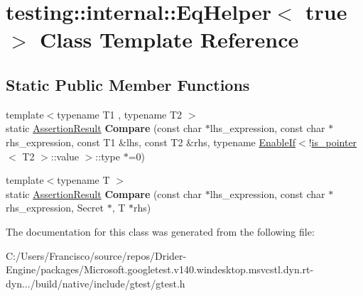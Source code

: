 \hypertarget{classtesting_1_1internal_1_1_eq_helper_3_01true_01_4}{}\section{testing\+:\+:internal\+:\+:Eq\+Helper$<$ true $>$ Class Template Reference}
\label{classtesting_1_1internal_1_1_eq_helper_3_01true_01_4}
\subsection*{Static Public Member Functions}
\begin{DoxyCompactItemize}
\item 
\mbox{\label{classtesting_1_1internal_1_1_eq_helper_3_01true_01_4_a12c7194b2a210b61f06c912eef484ca6}} 
{\footnotesize template$<$typename T1 , typename T2 $>$ }\\static \hyperlink{classtesting_1_1_assertion_result}{Assertion\+Result} {\bfseries Compare} (const char $\ast$lhs\+\_\+expression, const char $\ast$rhs\+\_\+expression, const T1 \&lhs, const T2 \&rhs, typename \hyperlink{structtesting_1_1internal_1_1_enable_if}{Enable\+If}$<$!\hyperlink{structtesting_1_1internal_1_1is__pointer}{is\+\_\+pointer}$<$ T2 $>$\+::value $>$\+::type $\ast$=0)
\item 
\mbox{\label{classtesting_1_1internal_1_1_eq_helper_3_01true_01_4_a6f292601a68c8f0d49e6d48bd309b900}} 
{\footnotesize template$<$typename T $>$ }\\static \hyperlink{classtesting_1_1_assertion_result}{Assertion\+Result} {\bfseries Compare} (const char $\ast$lhs\+\_\+expression, const char $\ast$rhs\+\_\+expression, Secret $\ast$, T $\ast$rhs)
\end{DoxyCompactItemize}


The documentation for this class was generated from the following file\+:\begin{DoxyCompactItemize}
\item 
C\+:/\+Users/\+Francisco/source/repos/\+Drider-\/\+Engine/packages/\+Microsoft.\+googletest.\+v140.\+windesktop.\+msvcstl.\+dyn.\+rt-\/dyn.../build/native/include/gtest/gtest.\+h\end{DoxyCompactItemize}
